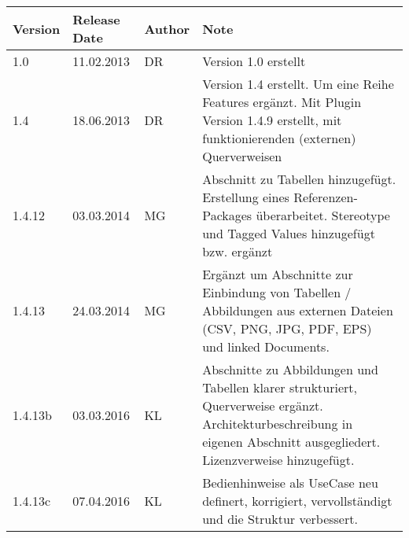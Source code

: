 

\begin{tabular}{|>{\raggedright}p{41pt}|>{\raggedright}p{99pt}|>{\raggedright}p{48pt}|>{\raggedright}p{216pt}|}
\hline
Version & Release Date & Author & Note\tabularnewline
\hline
1.0 & 11.02.2013 & DR & Version 1.0 erstellt\tabularnewline
\hline
1.4 & 18.06.2013 & DR & Version 1.4 erstellt. Um eine Reihe Features ergänzt. 
Mit Plugin Version 1.4.9 erstellt, mit funktionierenden (externen) Querverweisen\tabularnewline
\hline
1.4.12 & 03.03.2014 & MG & Abschnitt zu Tabellen hinzugefügt. Erstellung eines 
Referenzen-Packages überarbeitet. Stereotype und Tagged Values hinzugefügt bzw. 
ergänzt\tabularnewline
\hline
1.4.13 & 24.03.2014 & MG & Ergänzt um Abschnitte zur Einbindung von  Tabellen 
/ Abbildungen aus externen Dateien (CSV, PNG, JPG, PDF, EPS) und linked Documents.\tabularnewline
\hline
1.4.13b & 03.03.2016 & KL & Abschnitte zu Abbildungen und Tabellen klarer strukturiert, 
Querverweise ergänzt. Architekturbeschreibung in eigenen Abschnitt ausgegliedert. 
Lizenzverweise hinzugefügt.\tabularnewline
\hline
1.4.13c & 07.04.2016 & KL & Bedienhinweise als UseCase neu definert, korrigiert, 
vervollständigt und die Struktur verbessert.\tabularnewline
\hline
\end{tabular}

